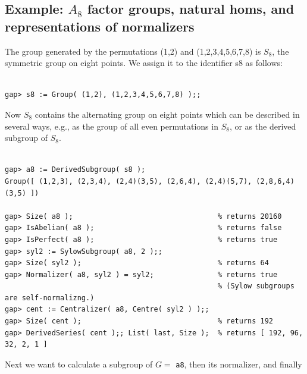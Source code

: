 

\vspace{5mm}
\subsection{Example: $A_8$ factor groups, natural homs, and representations of
  normalizers}\hspace{-2mm}\protect\footnotemark
{}
The group generated by the permutations (1,2) and (1,2,3,4,5,6,7,8) is $S_8$,
the symmetric group on eight points.  We assign it to the identifier s8 
as follows:
{\codesize
\begin{verbatim}

gap> s8 := Group( (1,2), (1,2,3,4,5,6,7,8) );;

\end{verbatim}}
\noindent Now $S_8$ contains the alternating group on eight points which can be described in
several ways, e.g., as the group of all even permutations in $S_8$, or as the derived
subgroup of $S_8$.
{\codesize
\begin{verbatim}

gap> a8 := DerivedSubgroup( s8 );  
Group([ (1,2,3), (2,3,4), (2,4)(3,5), (2,6,4), (2,4)(5,7), (2,8,6,4)(3,5) ])

gap> Size( a8 );                                  % returns 20160
gap> IsAbelian( a8 );                             % returns false
gap> IsPerfect( a8 );                             % returns true
gap> syl2 := SylowSubgroup( a8, 2 );; 
gap> Size( syl2 );                                % returns 64
gap> Normalizer( a8, syl2 ) = syl2;               % returns true   
                                                  % (Sylow subgroups are self-normalizng.)
gap> cent := Centralizer( a8, Centre( syl2 ) );; 
gap> Size( cent );                                % returns 192
gap> DerivedSeries( cent );; List( last, Size );  % returns [ 192, 96, 32, 2, 1 ]

\end{verbatim}}
\noindent Next we want to calculate a subgroup of $G = $ {\tt a8}, then its normalizer, and finally
